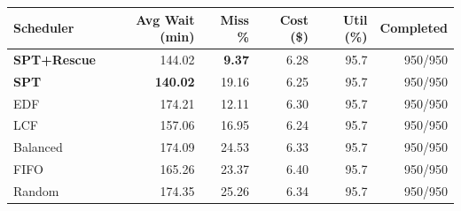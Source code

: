 \begin{tabular}{lrrrrr}
\toprule
\textbf{Scheduler} & \textbf{Avg Wait (min)} & \textbf{Miss \%} & \textbf{Cost (\$)} & \textbf{Util (\%)} & \textbf{Completed} \\
\midrule
\textbf{SPT+Rescue} & 144.02 & \textbf{9.37} & 6.28 & 95.7 & 950/950\\
\textbf{SPT} & \textbf{140.02} & 19.16 & 6.25 & 95.7 & 950/950\\
EDF & 174.21 & 12.11 & 6.30 & 95.7 & 950/950\\
LCF & 157.06 & 16.95 & 6.24 & 95.7 & 950/950\\
Balanced & 174.09 & 24.53 & 6.33 & 95.7 & 950/950\\
FIFO & 165.26 & 23.37 & 6.40 & 95.7 & 950/950\\
Random & 174.35 & 25.26 & 6.34 & 95.7 & 950/950\\
\bottomrule
\end{tabular}
